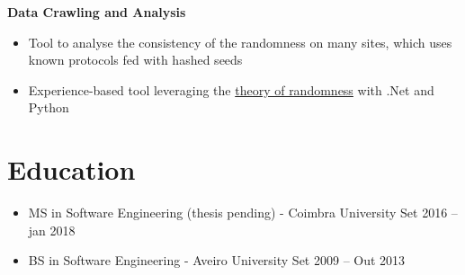 \documentclass[11pt]{article}       %
\begin{document}
\textbf{Data Crawling and Analysis}
\vspace{-9pt}
\begin{itemize}
  \item Tool to analyse the consistency of the randomness on many sites, which uses known protocols fed with hashed seeds
  \item Experience-based tool leveraging the \href{https://www.random.org/randomness/}{theory of randomness} with .Net and Python
\end{itemize}


\vspace{-18.5pt}

\section*{Education}
\begin{itemize}
\item MS in Software Engineering (thesis pending) - Coimbra University \hfill Set 2016 -- jan 2018 \\
\item BS in Software Engineering - Aveiro University \hfill Set 2009 -- Out 2013
\end{itemize}
\end{document}

